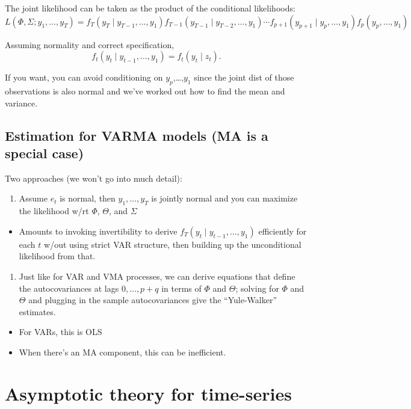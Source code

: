 The joint likelihood can be taken as the product of the conditional
likelihoods:
\[L(Φ, Σ; y_1,…,y_T) = f_T(y_T ∣ y_{T-1},…, y_1) f_{T-1}(y_{T-1} ∣
y_{T-2},…, y_1) ⋯ f_{p+1}(y_{p+1} ∣ y_p,…,y_1) f_p(y_p,…,y_1)\]

Assuming normality and correct specification,
\[f_t(y_t ∣ y_{t-1},…, y_1) = f_t(y_t ∣ z_t).\]

If you want, you can avoid conditioning on $y_p$,…,$y_1$ since the
joint dist of those observations is also normal and we've worked out
how to find the mean and variance.

\subsection{Estimation for VARMA models (MA is a special case)}

Two approaches (we won't go into much detail):

\begin{enumerate}
\item Assume $e_t$ is normal, then $y_1,…,y_T$ is jointly normal and
  you can maximize the likelihood w/rt $Φ$, $Θ$, and $Σ$
\end{enumerate}

\begin{itemize}
\item Amounts to invoking invertibility to derive $f_T(y_t ∣
  y_{t-1},…,y_1)$ efficiently for each $t$ w/out using strict VAR
  structure, then building up the unconditional likelihood from that.
\end{itemize}

\begin{enumerate}
\item Just like for VAR and VMA processes, we can derive equations
  that define the autocovariances at lags $0,…,p+q$ in terms of $Φ$
  and $Θ$; solving for $Φ$ and $Θ$ and plugging in the sample
  autocovariances give the ``Yule-Walker'' estimates.
\end{enumerate}

\begin{itemize}
\item For VARs, this is OLS
\item When there's an MA component, this can be inefficient.
\end{itemize}

\section{Asymptotic theory for time-series}

